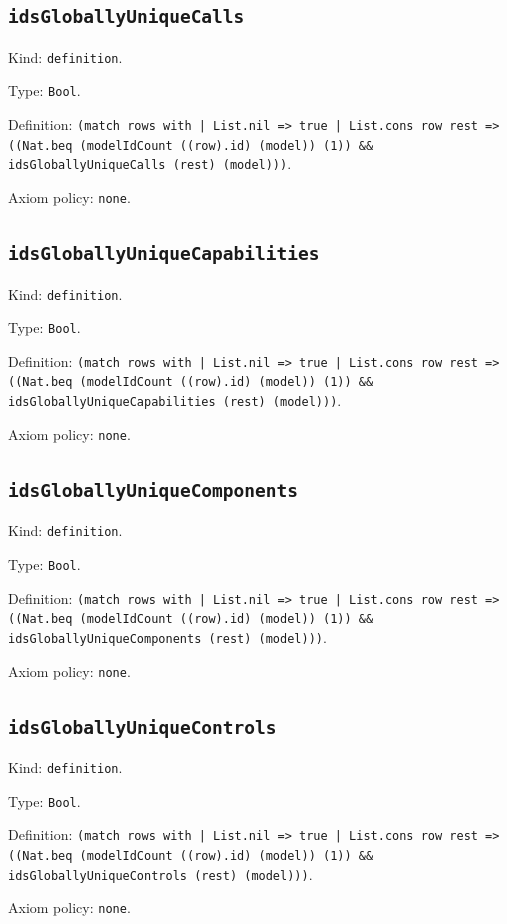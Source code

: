 \documentclass[11pt]{article}
\begin{document}
\subsection*{\texttt{idsGloballyUniqueCalls}}
\noindent Kind: \texttt{definition}.\par
\noindent Type: \texttt{Bool}.\par
\noindent Definition: \texttt{(match rows with | List.nil => true | List.cons row rest => ((Nat.beq (modelIdCount ((row).id) (model)) (1)) \&\& idsGloballyUniqueCalls (rest) (model)))}.\par
\noindent Axiom policy: \texttt{none}.\par
\subsection*{\texttt{idsGloballyUniqueCapabilities}}
\noindent Kind: \texttt{definition}.\par
\noindent Type: \texttt{Bool}.\par
\noindent Definition: \texttt{(match rows with | List.nil => true | List.cons row rest => ((Nat.beq (modelIdCount ((row).id) (model)) (1)) \&\& idsGloballyUniqueCapabilities (rest) (model)))}.\par
\noindent Axiom policy: \texttt{none}.\par
\subsection*{\texttt{idsGloballyUniqueComponents}}
\noindent Kind: \texttt{definition}.\par
\noindent Type: \texttt{Bool}.\par
\noindent Definition: \texttt{(match rows with | List.nil => true | List.cons row rest => ((Nat.beq (modelIdCount ((row).id) (model)) (1)) \&\& idsGloballyUniqueComponents (rest) (model)))}.\par
\noindent Axiom policy: \texttt{none}.\par
\subsection*{\texttt{idsGloballyUniqueControls}}
\noindent Kind: \texttt{definition}.\par
\noindent Type: \texttt{Bool}.\par
\noindent Definition: \texttt{(match rows with | List.nil => true | List.cons row rest => ((Nat.beq (modelIdCount ((row).id) (model)) (1)) \&\& idsGloballyUniqueControls (rest) (model)))}.\par
\noindent Axiom policy: \texttt{none}.\par
\end{document}
